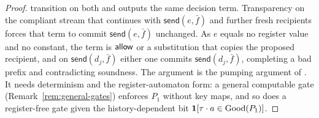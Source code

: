 \begin{proof}
transition on both and outputs the same decision term. Transparency on the compliant stream that continues with
$\mathsf{send}(e,\bar f)$ and further fresh recipients forces that term to commit $\mathsf{send}(e,\bar f)$ unchanged. As $e$
equals no register value and no constant, the term is $\mathsf{allow}$ or a substitution that copies the proposed recipient, and on
$\mathsf{send}(d_j,\bar f)$ either one commits $\mathsf{send}(d_j,\bar f)$, completing a bad prefix and contradicting soundness.
The argument is the pumping argument of \citet{kaminski1994finite}. It needs determinism and the register-automaton form: a
general computable gate (Remark~\ref{rem:general-gates}) enforces $P_1$ without key maps, and so does a register-free gate
given the history-dependent bit $\mathbf{1}[\tau\cdot a\in\mathrm{Good}(P_1)]$.
\end{proof}

